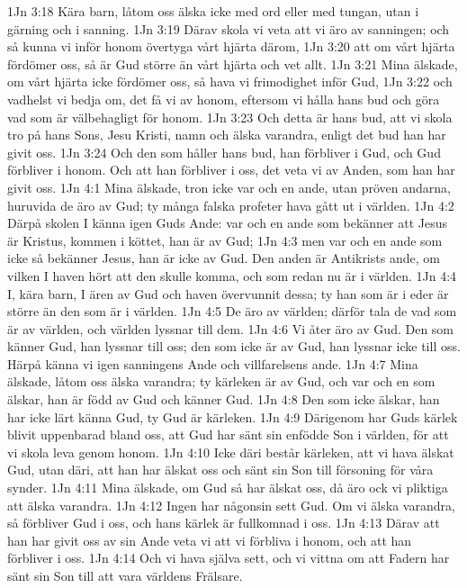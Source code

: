 1Jn 3:18  Kära barn, låtom oss älska icke med ord eller med tungan, utan i gärning och i sanning.
1Jn 3:19  Därav skola vi veta att vi äro av sanningen; och så kunna vi inför honom övertyga vårt hjärta därom,
1Jn 3:20  att om vårt hjärta fördömer oss, så är Gud större än vårt hjärta och vet allt.
1Jn 3:21  Mina älskade, om vårt hjärta icke fördömer oss, så hava vi frimodighet inför Gud,
1Jn 3:22  och vadhelst vi bedja om, det få vi av honom, eftersom vi hålla hans bud och göra vad som är välbehagligt för honom.
1Jn 3:23  Och detta är hans bud, att vi skola tro på hans Sons, Jesu Kristi, namn och älska varandra, enligt det bud han har givit oss.
1Jn 3:24  Och den som håller hans bud, han förbliver i Gud, och Gud förbliver i honom. Och att han förbliver i oss, det veta vi av Anden, som han har givit oss.
1Jn 4:1  Mina älskade, tron icke var och en ande, utan pröven andarna, huruvida de äro av Gud; ty många falska profeter hava gått ut i världen.
1Jn 4:2  Därpå skolen I känna igen Guds Ande: var och en ande som bekänner att Jesus är Kristus, kommen i köttet, han är av Gud;
1Jn 4:3  men var och en ande som icke så bekänner Jesus, han är icke av Gud. Den anden är Antikrists ande, om vilken I haven hört att den skulle komma, och som redan nu är i världen.
1Jn 4:4  I, kära barn, I ären av Gud och haven övervunnit dessa; ty han som är i eder är större än den som är i världen.
1Jn 4:5  De äro av världen; därför tala de vad som är av världen, och världen lyssnar till dem.
1Jn 4:6  Vi åter äro av Gud. Den som känner Gud, han lyssnar till oss; den som icke är av Gud, han lyssnar icke till oss. Härpå känna vi igen sanningens Ande och villfarelsens ande.
1Jn 4:7  Mina älskade, låtom oss älska varandra; ty kärleken är av Gud, och var och en som älskar, han är född av Gud och känner Gud.
1Jn 4:8  Den som icke älskar, han har icke lärt känna Gud, ty Gud är kärleken.
1Jn 4:9  Därigenom har Guds kärlek blivit uppenbarad bland oss, att Gud har sänt sin enfödde Son i världen, för att vi skola leva genom honom.
1Jn 4:10  Icke däri består kärleken, att vi hava älskat Gud, utan däri, att han har älskat oss och sänt sin Son till försoning för våra synder.
1Jn 4:11  Mina älskade, om Gud så har älskat oss, då äro ock vi pliktiga att älska varandra.
1Jn 4:12  Ingen har någonsin sett Gud. Om vi älska varandra, så förbliver Gud i oss, och hans kärlek är fullkomnad i oss.
1Jn 4:13  Därav att han har givit oss av sin Ande veta vi att vi förbliva i honom, och att han förbliver i oss.
1Jn 4:14  Och vi hava själva sett, och vi vittna om att Fadern har sänt sin Son till att vara världens Frälsare.
